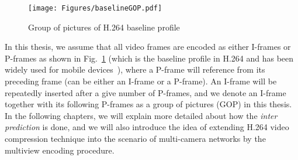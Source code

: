 %
\begin{figure}
\begin{center}
\texttt{[image: Figures/baselineGOP.pdf]}
\caption{\label{fig::baselineGOP}Group of pictures of H.264 baseline profile}
\end{center}
\end{figure}
%
In this thesis, we assume that all video frames are encoded as either I-frames or P-frames as shown in Fig.~\ref{fig::baselineGOP} (which is the baseline profile in H.264 and has been widely used for mobile devices~\cite{h264Recommendation}), where a P-frame will reference from its preceding frame (can be either an I-frame or a P-frame).
An I-frame will be repeatedly inserted after a give number of P-frames, and we denote an I-frame together with its following P-frames as a group of pictures (GOP) in this thesis.
In the following chapters, we will explain more detailed about how the \emph{inter prediction} is done, and we will also introduce the idea of extending H.264 video compression technique into the scenario of multi-camera networks by the multiview encoding procedure.
